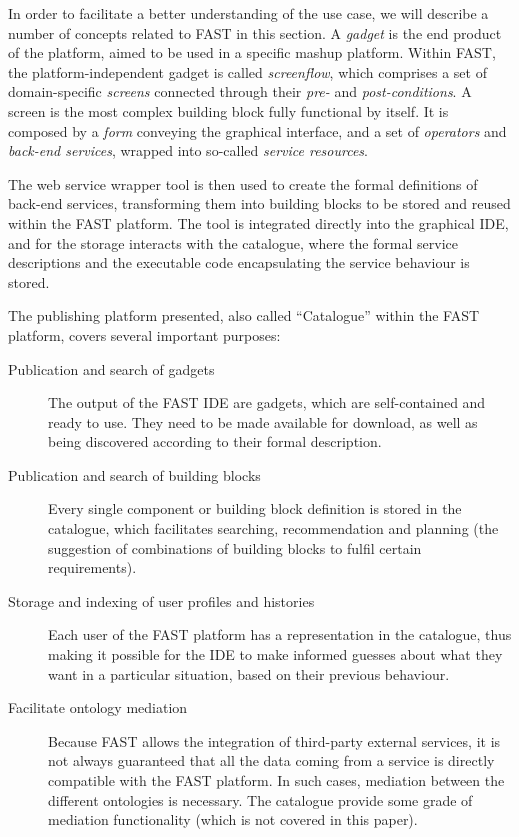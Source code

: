 In order to facilitate a better understanding of the use case, we will describe a number of concepts related to FAST in this section. A \emph{gadget} is the end product of the platform, aimed to be used in a specific mashup platform. Within FAST, the platform-independent gadget is called \emph{screenflow}, which comprises a set of domain-specific \emph{screens} connected through their \emph{pre-} and \emph{post-conditions}. A screen is the most complex building block fully functional by itself. It is composed by a \emph{form} conveying the graphical interface, and a set of \emph{operators} and \emph{back-end services}, wrapped into so-called \emph{service resources}.

The web service wrapper tool is then used to create the formal definitions of back-end services, transforming them into building blocks to be stored and reused within the FAST platform. The tool is integrated directly into the graphical IDE, and for the storage interacts with the catalogue, where the formal service descriptions and the executable code encapsulating the service behaviour is stored.

The publishing platform presented, also called ``Catalogue'' within the FAST platform, covers several important purposes:
\begin{description}
	\item[Publication and search of gadgets] The output of the FAST IDE are gadgets, which are self-contained and ready to use. They need to be made available for download, as well as being discovered according to their formal description.
	\item[Publication and search of building blocks] Every single component or building block definition is stored in the catalogue, which facilitates searching, recommendation and planning (the suggestion of combinations of building blocks to fulfil certain requirements). 
	\item[Storage and indexing of user profiles and histories] Each user of the FAST platform has a representation in the catalogue, thus making it possible for the IDE to make informed guesses about what they want in a particular situation, based on their previous behaviour.
	\item[Facilitate ontology mediation] Because FAST allows the integration of third-party external services, it is not always guaranteed that all the data coming from a service is directly compatible with the FAST platform. In such cases, mediation between the different ontologies is necessary. The catalogue provide some grade of mediation functionality (which is not covered in this paper).
\end{description}
